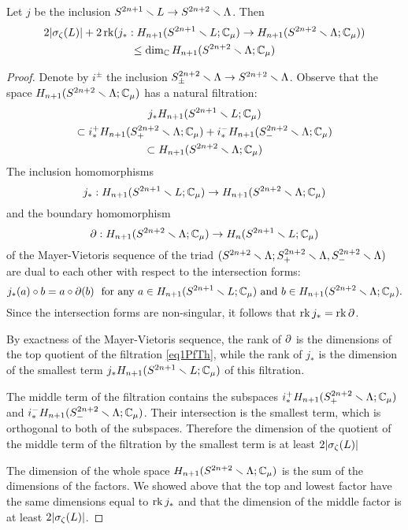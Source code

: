 \documentclass{article}
\numberwithin{equation}{section}
\begin{document}
\begin{lem}\label{Lemma1Th} 
Let $j$ be the inclusion $S^{2n+1}\smallsetminus L\to S^{2n+2}\smallsetminus\Lambda$. 
Then
\begin{multline}\label{eq0PfTh} 
2|\sigma_\zeta(L)| +
2\operatorname{rk}(j_*:H_{n+1}(S^{2n+1}\smallsetminus L;\mathbb C_\mu)\to 
H_{n+1}(S^{2n+2}\smallsetminus\Lambda;\mathbb C_\mu))\\
\le \dim_\mathbb C H_{n+1}(S^{2n+2}\smallsetminus\Lambda;\mathbb C_\mu)
\end{multline}
\end{lem}
\begin{proof}
Denote by $i^\pm$ the inclusion 
$S^{2n+2}_\pm\smallsetminus\Lambda\to S^{2n+2}\smallsetminus\Lambda$.
Observe that the space $H_{n+1}(S^{2n+2}\smallsetminus\Lambda;\mathbb C_\mu)$ 
has a natural filtration:
\begin{multline}\label{eq1PfTh}
j_*H_{n+1}(S^{2n+1}\smallsetminus L;\mathbb C_\mu)\\
\subset
i^+_*H_{n+1}(S^{2n+2}_+\smallsetminus\Lambda;\mathbb C_\mu)+
i^-_*H_{n+1}(S^{2n+2}_-\smallsetminus\Lambda;\mathbb C_\mu)\\
\subset
H_{n+1}(S^{2n+2}\smallsetminus\Lambda;\mathbb C_\mu)
\end{multline}
The inclusion homomorphisms 
$$j_*:H_{n+1}(S^{2n+1}\smallsetminus L;\mathbb C_\mu)\to 
H_{n+1}(S^{2n+2}\smallsetminus\Lambda;\mathbb C_\mu)$$ 
and the boundary homomorphism 
$$
\partial:H_{n+1}(S^{2n+2}\smallsetminus\Lambda;\mathbb C_\mu)\to H_{n}(S^{2n+1}\smallsetminus L;\mathbb C_\mu) 
$$
of the Mayer-Vietoris sequence of the triad $(S^{2n+2}\smallsetminus\Lambda;
S^{2n+2}_+\smallsetminus\Lambda,S^{2n+2}_-\smallsetminus\Lambda)$ are dual to each other
with respect to the intersection forms: 
$$
j_*(a)\circ b=a\circ\partial(b)\ \text{ for any }a\in
H_{n+1}(S^{2n+1}\smallsetminus L;\mathbb C_\mu)\text{ and }b\in
H_{n+1}(S^{2n+2}\smallsetminus\Lambda;\mathbb C_\mu).
$$
Since the intersection forms are non-singular, it follows that 
$\operatorname{rk} j_*=\operatorname{rk} \partial$.

By exactness of the Mayer-Vietoris sequence, the rank of $\partial$ is 
the dimensions of the top quotient of the filtration \eqref{eq1PfTh}, while
the rank of $j_*$ is the dimension of the smallest term 
$j_*H_{n+1}(S^{2n+1}\smallsetminus L;\mathbb C_\mu)$ of this filtration.

The middle term of the filtration contains the subspaces 
$i^+_*H_{n+1}(S^{2n+2}_+\smallsetminus\Lambda;\mathbb C_\mu)$ and 
$i^-_*H_{n+1}(S^{2n+2}_-\smallsetminus\Lambda;\mathbb C_\mu)$. Their intersection 
is the smallest term, which is orthogonal to both of the subspaces.
Therefore the dimension of the quotient of the middle term of the
filtration by the smallest term is at least $2|\sigma_\zeta(L)|$

The dimension of the whole space $H_{n+1}(S^{2n+2}\smallsetminus\Lambda;\mathbb C_\mu)$
is the sum of the dimensions of the factors. We showed above that the
top and lowest factor have the same dimensions equal to $\operatorname{rk} j_*$ and 
that the dimension of the middle factor is at least $2|\sigma_\zeta(L)|$.
\end{proof} 
\end{document}
